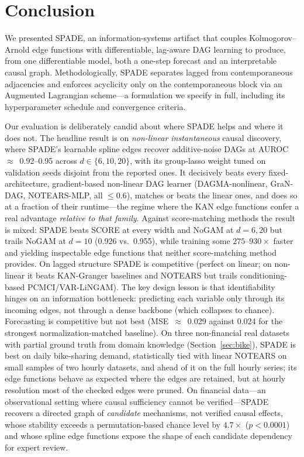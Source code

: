 
\section{Conclusion}
\label{sec:conclusion}

We presented SPADE, an information-systems artifact that couples
Kolmogorov--Arnold edge functions with differentiable, lag-aware DAG learning to
produce, from one differentiable model, both a one-step forecast and an
interpretable causal graph. Methodologically, SPADE separates lagged from
contemporaneous adjacencies and enforces acyclicity only on the contemporaneous
block via an Augmented Lagrangian scheme---a formulation we specify in full,
including its hyperparameter schedule and convergence criteria.

Our evaluation is deliberately candid about where SPADE helps and where it does
not. The headline result is on \emph{non-linear instantaneous} causal discovery,
where SPADE's learnable spline edges recover additive-noise DAGs at
AUROC~$\approx$~0.92--0.95 across $d\in\{6,10,20\}$, with its group-lasso weight
tuned on validation seeds disjoint from the reported ones. It decisively beats
every fixed-architecture, gradient-based non-linear DAG learner (DAGMA-nonlinear,
GraN-DAG, NOTEARS-MLP, all $\le$0.6), matches or beats the linear ones, and does
so at a fraction of their runtime---the regime where the KAN edge functions confer
a real advantage \emph{relative to that family}. Against score-matching methods
the result is mixed: SPADE beats SCORE at every width and NoGAM at $d{=}6,20$ but
trails NoGAM at $d{=}10$ (0.926 vs.\ 0.955), while training some
$275$--$930\times$ faster and yielding inspectable edge functions that neither
score-matching method provides. On lagged structure SPADE is competitive
(perfect on linear; on non-linear it beats KAN-Granger baselines and NOTEARS but
trails conditioning-based PCMCI/VAR-LiNGAM). The key design lesson is that
identifiability hinges on an information bottleneck: predicting each variable
only through its incoming edges, not through a dense backbone (which collapses to
chance). Forecasting is competitive but not best (MSE~$\approx$~0.029 against
0.024 for the strongest normalization-matched baseline). On three non-financial real datasets with partial ground truth from domain knowledge (Section~\ref{sec:bike}), SPADE is best on daily bike-sharing demand, statistically tied with linear NOTEARS on small samples of two hourly datasets, and ahead of it on the full hourly series; its edge functions behave as expected where the edges are retained, but at hourly resolution most of the checked edges were pruned.
On financial data---an observational setting where causal sufficiency cannot be
verified---SPADE recovers a directed graph of \emph{candidate} mechanisms, not
verified causal effects, whose stability exceeds a permutation-based chance
level by $4.7\times$ ($p<0.0001$) and whose spline edge functions expose the
shape of each candidate dependency for expert review.

